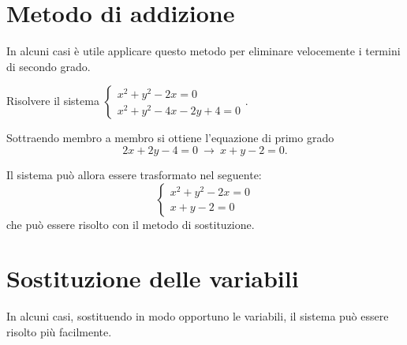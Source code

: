 \section{Metodo di addizione}

In alcuni casi è utile applicare questo metodo per eliminare velocemente i termini di secondo grado.

\begin{exrig}
\begin{esempio}
Risolvere il sistema $\left\{\begin{array}{l}x^2+y^2-2x=0 \\x^2+y^2-4x-2y+4=0 \end{array}\right.$.

Sottraendo membro a membro si ottiene l'equazione di primo grado \[2x+2y-4=0~\rightarrow~ x+y-2=0.\]

Il sistema può allora essere trasformato nel seguente:
\[\left\{\begin{array}{l}x^2+y^2-2x=0 \\x+y-2=0 \end{array}\right.\]
che può essere risolto con il metodo di sostituzione.
\end{esempio}
\end{exrig}
\pagebreak
\section{Sostituzione delle variabili}

In alcuni casi, sostituendo in modo opportuno le variabili, il sistema può essere risolto più facilmente.

